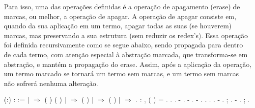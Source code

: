  Para isso, uma das operações definidas é a operação de apagamento (erase) de marcas, ou melhor,
a operação de apagar. A operação de apagar consiste em, quando da sua aplicação em um termo, apagar
todas as suas (se houverem) marcas, mas preservando a sua estrutura (sem reduzir os redex's). Essa operação
foi definida recursivamente como se segue abaixo, sendo propagada para dentro de cada termo, com atenção
especial à abstração marcada, que transforma-se em abstração, e mantém a propagação do erase. Assim, 
após a aplicação da operação, um termo marcado se tornará um termo sem marcas, e um termo sem marcas não
sofrerá nenhuma alteração.\begin{coqdoccode}
\coqdocemptyline
\coqdocnoindent
{}  (:) :  :=\coqdoceol
\coqdocindent{1.00em}
  \coqdoceol
\coqdocindent{1.00em}
\ensuremath{|}    \ensuremath{\Rightarrow}  ( ) ( )\coqdoceol
\coqdocindent{1.00em}
\ensuremath{|}   \ensuremath{\Rightarrow}  ( )\coqdoceol
\coqdocindent{1.00em}
\ensuremath{|}   \ensuremath{\Rightarrow}  ( )\coqdoceol
\coqdocindent{1.00em}
\ensuremath{|} \coqdocvar{\_} \ensuremath{\Rightarrow} \coqdoceol
\coqdocindent{1.00em}
.\coqdoceol
\coqdocemptyline
\coqdocemptyline
\coqdocnoindent
{} : \coqdockw{\ensuremath{\forall}} ,  ( ) =  .\coqdoceol
\coqdocnoindent
{}.\coqdoceol
\coqdocindent{1.00em}
 .\coqdoceol
\coqdocindent{1.00em}
- .\coqdoceol
\coqdocindent{1.00em}
- .\coqdoceol
\coqdocindent{1.00em}
- .\coqdoceol
\coqdocindent{2.00em}
 .\coqdoceol
\coqdocindent{2.00em}
 .\coqdoceol
\coqdocindent{2.00em}
.\coqdoceol
\coqdocindent{1.00em}
- .\coqdoceol
\coqdocindent{2.00em}
 ; .\coqdoceol
\coqdocindent{1.00em}
- .\coqdoceol
\coqdocindent{2.00em}
 ; .\coqdoceol

\end{coqdoccode}
